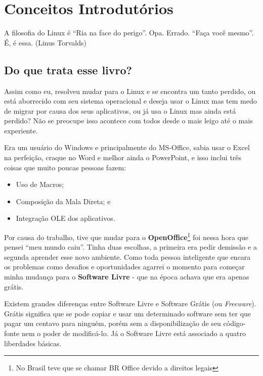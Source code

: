 \chapter{Conceitos Introdutórios}

\begin{remark}
A filosofia do Linux é ``Ria na face do perigo''. Opa. Errado. ``Faça você mesmo''. É, é essa. (Linus Torvalds) 
\end{remark}

\section{Do que trata esse livro?}

Assim como eu, resolveu mudar para o Linux e se encontra um tanto perdido, ou está aborrecido com seu sistema operacional e deseja usar o Linux mas tem medo de migrar por causa dos seus aplicativos, ou já usa o Linux mas ainda está perdido? Não se preocupe isso acontece com todos desde o mais leigo até o mais experiente.

Era um usuário do Windows e principalmente do MS-Office, sabia usar o Excel na perfeição, craque no Word e melhor ainda o PowerPoint, e isso inclui três coisas que muito poucas pessoas fazem: \vspace{-1em}
\begin{itemize}[noitemsep]
 \item Uso de Macros;
 \item Composição da Mala Direta; e 
 \item Integração OLE dos aplicativos.
\end{itemize}

Por causa do trabalho, tive que mudar para o \textbf{OpenOffice}\footnote{No Brasil teve que se chamar BR Office devido a direitos legais} foi nessa hora que pensei ``meu mundo caiu''. Tinha duas escolhas, a primeira era pedir demissão e a segunda aprender esse novo ambiente. Como toda pessoa inteligente que encara os problemas como desafios e oportunidades agarrei o momento para começar minha mudança para o \textbf{Software Livre} - que na época achava que era apenas grátis.

Existem grandes diferenças entre Software Livre e Software Grátis (ou \textit{Freeware}). Grátis significa que se pode copiar e usar um determinado software sem ter que pagar um centavo para ninguém, porém sem a disponibilização de seu código-fonte nem o poder de modificá-lo. Já o Software Livre está associado a quatro liberdades básicas.

